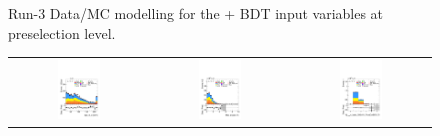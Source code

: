\begin{figure}[htbp]
  \caption{Run-3 Data/MC modelling for the \thqb + \ttH BDT input variables at preselection level.}
  \label{tth_vars_modelling_run3_2}
\end{figure}

\begin{figure}[htbp]
  \centering
  \setlength{\tabcolsep}{1.5pt}
  \renewcommand{\arraystretch}{1.0}

  \begin{tabular}{@{}c c c@{}}
    \includegraphics[width=0.33\textwidth]{images/plots_modelling_run2_run3_variables/run_3_tth/plot_bjet_0_pt_hh_tth_22_23_24.pdf} &
    \includegraphics[width=0.33\textwidth]{images/plots_modelling_run2_run3_variables/run_3_tth/plot_dEta_bH_max_hh_tth_22_23_24.pdf} &
    \includegraphics[width=0.33\textwidth]{images/plots_modelling_run2_run3_variables/run_3_tth/plot_n_bjets_GN2v01_FixedCutBEff_70_hh_tth_22_23_24.pdf}

\end{tabular}
\end{figure}
